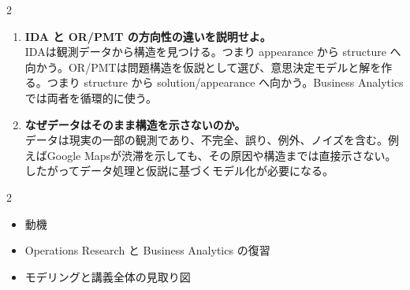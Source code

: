 \begin{multicols}{2}
\begin{enumerate}
\item \textbf{IDA と OR/PMT の方向性の違いを説明せよ。}\\
IDAは観測データから構造を見つける。つまり appearance から structure へ向かう。OR/PMTは問題構造を仮説として選び、意思決定モデルと解を作る。つまり structure から solution/appearance へ向かう。Business Analyticsでは両者を循環的に使う。
\item \textbf{なぜデータはそのまま構造を示さないのか。}\\
データは現実の一部の観測であり、不完全、誤り、例外、ノイズを含む。例えばGoogle Mapsが渋滞を示しても、その原因や構造までは直接示さない。したがってデータ処理と仮説に基づくモデル化が必要になる。
\end{enumerate}

\end{multicols}

\clearpage



\vspace{1.5mm}

\begin{multicols}{2}

\footnotesize

\raggedcolumns


\begin{itemize}
\item 動機
\item Operations Research と Business Analytics の復習
\item モデリングと講義全体の見取り図
\end{itemize}

\end{multicols}

\clearpage



\vspace{1.5mm}

